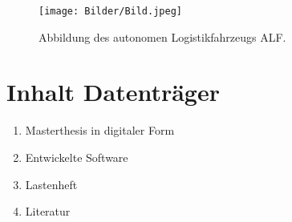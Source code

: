 \documentclass[12pt,a4paper,oneside,numbers=noenddot,headsepline,captions=tableheading,toc=bibliography,openany,tikz,margin=5mm]{scrbook}
\begin{document}
\begin{appendix}
\begin{table}[H]
\begin{center}
\begin{tabular}{|m{}<{\centering}|m{}<{\centering}|}
								
								\hline
							\end{tabular}
						\end{center}
						
						\label{fig: knotenmengen}
					\end{table}
				
				
					\begin{figure}[H]
						\centering
						\texttt{[image: Bilder/Bild.jpeg]}
						\caption{Abbildung des autonomen Logistikfahrzeugs ALF.}
						\label{fig: Wirkstruktur Schlupfregelung}
					\end{figure}
					
				
				
				
					\newpage 
					
				
					
					\section{Inhalt Datenträger} 
					\label{dataCD}
					\begin{enumerate}[label=\textbf{\arabic*},ref=A.1.\arabic*]
						\item Masterthesis in digitaler Form
						\label{it: dig}
						\item Entwickelte Software
						\label{it: Software}
						\item Lastenheft
						\label{it: Lastenheft}
						\item Literatur
						
					\end{enumerate}
				
		
	\end{appendix}
	
	
\end{document}
